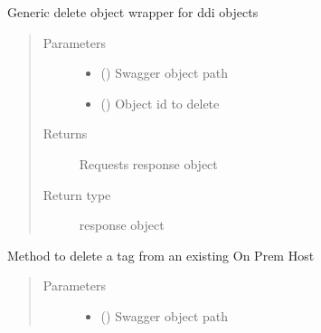 \documentclass[letterpaper,10pt,english]{sphinxmanual}
\begin{document}
\begin{fulllineitems}
\begin{fulllineitems}
\label{\detokenize{b1cdc-class:bloxone.b1cdc.delete}}
\sphinxAtStartPar
Generic delete object wrapper for ddi objects
\begin{quote}\begin{description}
\item[{Parameters}] \leavevmode\begin{itemize}
\item {} 
\sphinxAtStartPar
{} () \textendash{} Swagger object path

\item {} 
\sphinxAtStartPar
{} () \textendash{} Object id to delete

\end{itemize}

\item[{Returns}] \leavevmode
\sphinxAtStartPar
Requests response object

\item[{Return type}] \leavevmode
\sphinxAtStartPar
response object

\end{description}\end{quote}

\end{fulllineitems}


\begin{fulllineitems}
\label{\detokenize{b1cdc-class:bloxone.b1cdc.delete_tag}}
\sphinxAtStartPar
Method to delete a tag from an existing On Prem Host
\begin{quote}\begin{description}
\item[{Parameters}] \leavevmode\begin{itemize}
\item {} 
\sphinxAtStartPar
{} () \textendash{} Swagger object path


\end{itemize}
\end{description}
\end{quote}
\end{fulllineitems}
\end{fulllineitems}
\end{document}
